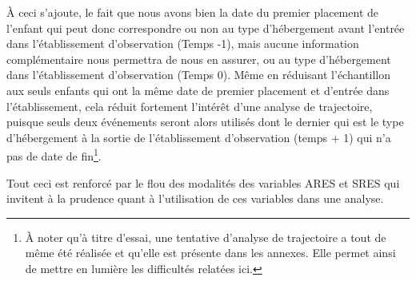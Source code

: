 \documentclass[
  12,
  a4paper,
]{report}
\begin{document}

À ceci s'ajoute, le fait que nous avons bien la date du premier
placement de l'enfant qui peut donc correspondre ou non au type
d'hébergement avant l'entrée dans l'établissement d'observation (Temps
-1), mais aucune information complémentaire nous permettra de nous en
assurer, ou au type d'hébergement dans l'établissement d'observation
(Temps 0). Même en réduisant l'échantillon aux seuls enfants qui ont la
même date de premier placement et d'entrée dans l'établissement, cela
réduit fortement l'intérêt d'une analyse de trajectoire, puisque seuls
deux événements seront alors utilisés dont le dernier qui est le type
d'hébergement à la sortie de l'établissement d'observation (temps + 1)
qui n'a pas de date de fin\footnote{À noter qu'à titre d'essai, une
  tentative d'analyse de trajectoire a tout de même été réalisée et
  qu'elle est présente dans les annexes. Elle permet ainsi de mettre en
  lumière les difficultés relatées ici.}.

Tout ceci est renforcé par le flou des modalités des variables ARES et
SRES qui invitent à la prudence quant à l'utilisation de ces variables
dans une analyse.
\end{document}
